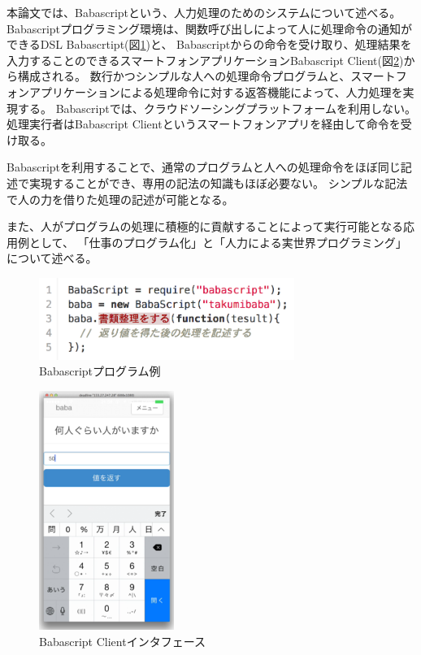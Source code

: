 \documentclass[twoside]{wiss}
\begin{document}
本論文では、Babascriptという、人力処理のためのシステムについて述べる。
Babascriptプログラミング環境は、関数呼び出しによって人に処理命令の通知ができるDSL Babascrtipt(図\ref{script_01})と、
Babascriptからの命令を受け取り、処理結果を入力することのできるスマートフォンアプリケーションBabascript Client(図\ref{webapp-interface})から構成される。
数行かつシンプルな人への処理命令プログラムと、スマートフォンアプリケーションによる処理命令に対する返答機能によって、人力処理を実現する。
Babascriptでは、クラウドソーシングプラットフォームを利用しない。
処理実行者はBabascript Clientというスマートフォンアプリを経由して命令を受け取る。

Babascriptを利用することで、通常のプログラムと人への処理命令をほぼ同じ記述で実現することができ、専用の記法の知識もほぼ必要ない。
シンプルな記法で人の力を借りた処理の記述が可能となる。

また、人がプログラムの処理に積極的に貢献することによって実行可能となる応用例として、
「仕事のプログラム化」と「人力による実世界プログラミング」について述べる。

\begin{figure}[!h]
  \centering
  \includegraphics[width=83mm, bb=0 0 751 241]{images/script_01.png}
  \caption{Babascriptプログラム例}
  \label{script_01}
\end{figure}

\begin{figure}[!h]  
  \centering
  \includegraphics[width=44mm, bb=0 0 249 441]{images/interface.png}
  \caption{Babascript Clientインタフェース}
  \label{webapp-interface}
\end{figure}
\end{document}
